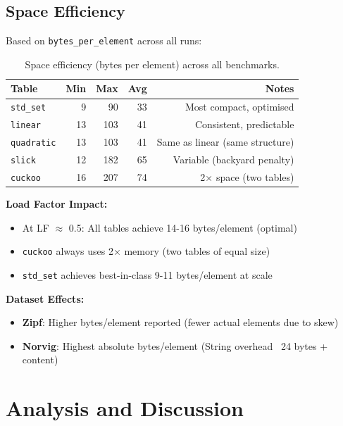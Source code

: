 \documentclass[11pt,a4paper]{article}
\begin{document}
\subsection{Space Efficiency}

Based on \texttt{bytes\_per\_element} across all runs:

\begin{table}[H]
  \centering
  \begin{tabular}{lrrrr}
    \toprule
    \textbf{Table} & \textbf{Min} & \textbf{Max} & \textbf{Avg} & \textbf{Notes} \\
    \midrule
    \texttt{std\_set} & 9 & 90 & 33 & Most compact, optimised \\
    \texttt{linear} & 13 & 103 & 41 & Consistent, predictable \\
    \texttt{quadratic} & 13 & 103 & 41 & Same as linear (same structure) \\
    \texttt{slick} & 12 & 182 & 65 & Variable (backyard penalty) \\
    \texttt{cuckoo} & 16 & 207 & 74 & 2× space (two tables) \\
    \bottomrule
  \end{tabular}
  \caption{Space efficiency (bytes per element) across all benchmarks.}
  \label{tab:space-efficiency}
\end{table}

\textbf{Load Factor Impact:}
\begin{itemize}
  \item At LF $\approx$ 0.5: All tables achieve 14-16 bytes/element (optimal)
  \item \texttt{cuckoo} always uses 2× memory (two tables of equal size)
  \item \texttt{std\_set} achieves best-in-class 9-11 bytes/element at scale
\end{itemize}

\textbf{Dataset Effects:}
\begin{itemize}
  \item \textbf{Zipf}: Higher bytes/element reported (fewer actual elements due to skew)
  \item \textbf{Norvig}: Highest absolute bytes/element (String overhead ~24 bytes + content)
\end{itemize}

\section{Analysis and Discussion}
\end{document}
